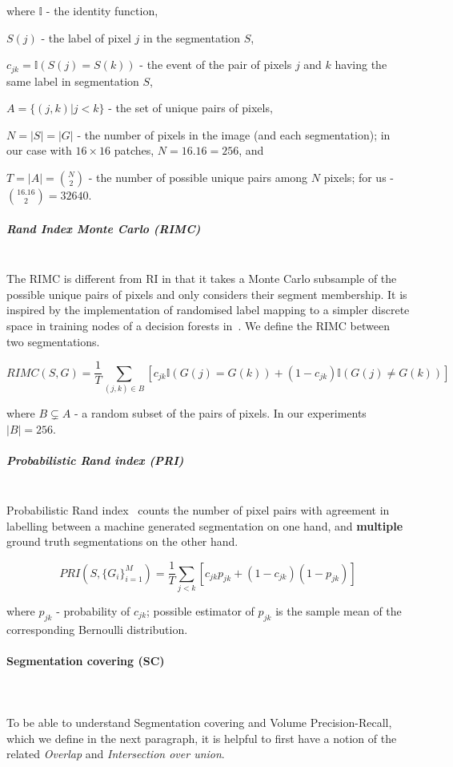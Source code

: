 where $\mathbb{I}$ - the identity function,

$S(j)$ - the label of pixel $j$ in the segmentation $S$,

$c_{jk}=\mathbb{I}\left(S(j)=S(k)\right)$ - the event of the pair
of pixels $j$ and $k$ having the same label in segmentation $S$,

$A=\{(j,k)|j<k\}$ - the set of unique pairs of pixels,

$N=\left|S\right|=\left|G\right|$ - the number of pixels in the image
(and each segmentation); in our case with $16\times 16$ patches, $N=16 . 16 = 256$, and 

$T=|A|=\binom{N}{2}$ - the number of possible unique pairs among
$N$ pixels; for us - $\binom{16 . 16}{2}=32 640$.


\subparagraph*{Rand Index Monte Carlo (RIMC)}\mbox{}\\ %
\label{sec:ch4-RIMC-maths}
The RIMC is different from RI in that it takes a Monte Carlo subsample of the possible unique pairs of pixels and only considers their segment membership. It is inspired by the implementation of randomised label mapping to a simpler discrete space in training nodes of a decision forests in~\cite{DollarICCV13edges}. We define the RIMC between two segmentations.

\[
RIMC(S,G)=\frac{1}{T}\sum\limits _{(j,k)\in B}\left[c_{jk}\mathbb{I}\left(G(j)=G(k)\right)+(1-c_{jk})\mathbb{I}\left(G(j)\neq G(k)\right)\right]
\]

where $B\subsetneq A$ - a random subset of the pairs of pixels.
In our experiments $|B|=256$.


\subparagraph*{Probabilistic Rand index (PRI)}\mbox{}\\
Probabilistic Rand index~\cite{UnnikrishnanPH07} counts the number of pixel pairs with agreement in %
labelling between a machine generated segmentation on one hand, and \textbf{multiple} ground truth segmentations on the other hand.


\[
PRI(S,\{G_{i}\}_{i=1}^{M})=\frac{1}{T}\sum\limits _{j<k}\left[c_{jk}p_{jk}+\left(1-c_{jk}\right)\left(1-p_{jk}\right)\right]
\]


where $p_{jk}$ - probability of $c_{jk}$; possible estimator of
$p_{jk}$ is the sample mean of the corresponding Bernoulli distribution.


\paragraph{Segmentation covering (SC)}\mbox{}\\\mbox{}\\
To be able to understand Segmentation covering and Volume Precision-Recall, which we define in the next paragraph, it is helpful to first have a notion of the related \textit{Overlap} and \textit{Intersection over union}.

